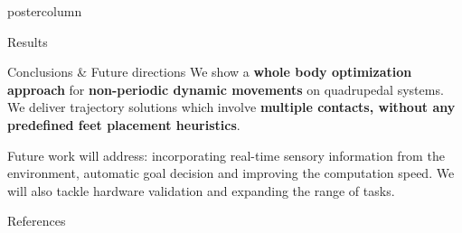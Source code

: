 \documentclass{beamer}
\begin{document}
\begin{frame}
\begin{columns}
\begin{column}{.4\textwidth}
\begin{beamercolorbox}[center]{postercolumn}
\begin{minipage}{.98\textwidth}
{\begin{myblock}{Results}
	\end{myblock}\vfill
	
	\begin{myblock}{Conclusions \& Future directions}
	 We show a \textbf{whole body optimization approach} for \textbf{non-periodic 
	dynamic movements} on quadrupedal systems. We deliver trajectory solutions which
	involve \textbf{multiple contacts, without any predefined feet placement heuristics}. 
	\vspace*{4mm}
	
	Future work will address: incorporating real-time sensory information from the environment, 
	automatic goal decision and improving the computation speed. We will also tackle 
	hardware validation and expanding the range of tasks.
	\end{myblock}\vfill

	
	\begin{myblock}{References}
		\footnotesize
		
		
	\end{myblock}\vfill
	}\end{minipage}\end{beamercolorbox}
	\end{column}
\end{columns}
\end{frame}
\end{document}
